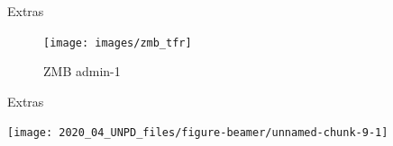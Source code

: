 \documentclass[ignorenonframetext,]{beamer}
\begin{document}
\begin{frame}{Extras}
\protect\hypertarget{extras-3}{}

\begin{figure}
\centering
\texttt{[image: images/zmb\_tfr]}
\caption{ZMB admin-1}
\end{figure}

\end{frame}

\begin{frame}{Extras}
\protect\hypertarget{extras-4}{}

\begin{center}\texttt{[image: 2020\_04\_UNPD\_files/figure-beamer/unnamed-chunk-9-1]} \end{center}

\end{frame}
\end{document}

